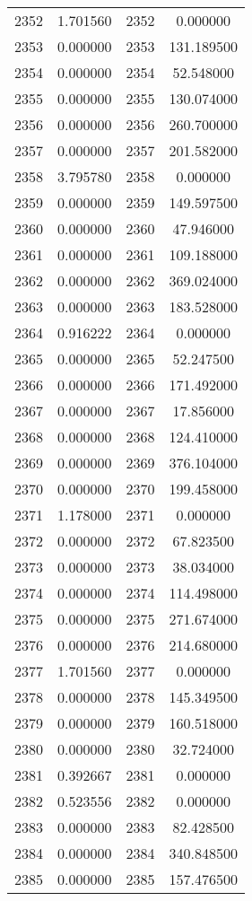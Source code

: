 \documentclass[12pt]{article}
\begin{document}
\begin{longtable}{@{}cccc@{}}
2352 & 1.701560 & 2352 & 0.000000 \\
2353 & 0.000000 & 2353 & 131.189500 \\
2354 & 0.000000 & 2354 & 52.548000 \\
2355 & 0.000000 & 2355 & 130.074000 \\
2356 & 0.000000 & 2356 & 260.700000 \\
2357 & 0.000000 & 2357 & 201.582000 \\
2358 & 3.795780 & 2358 & 0.000000 \\
2359 & 0.000000 & 2359 & 149.597500 \\
2360 & 0.000000 & 2360 & 47.946000 \\
2361 & 0.000000 & 2361 & 109.188000 \\
2362 & 0.000000 & 2362 & 369.024000 \\
2363 & 0.000000 & 2363 & 183.528000 \\
2364 & 0.916222 & 2364 & 0.000000 \\
2365 & 0.000000 & 2365 & 52.247500 \\
2366 & 0.000000 & 2366 & 171.492000 \\
2367 & 0.000000 & 2367 & 17.856000 \\
2368 & 0.000000 & 2368 & 124.410000 \\
2369 & 0.000000 & 2369 & 376.104000 \\
2370 & 0.000000 & 2370 & 199.458000 \\
2371 & 1.178000 & 2371 & 0.000000 \\
2372 & 0.000000 & 2372 & 67.823500 \\
2373 & 0.000000 & 2373 & 38.034000 \\
2374 & 0.000000 & 2374 & 114.498000 \\
2375 & 0.000000 & 2375 & 271.674000 \\
2376 & 0.000000 & 2376 & 214.680000 \\
2377 & 1.701560 & 2377 & 0.000000 \\
2378 & 0.000000 & 2378 & 145.349500 \\
2379 & 0.000000 & 2379 & 160.518000 \\
2380 & 0.000000 & 2380 & 32.724000 \\
2381 & 0.392667 & 2381 & 0.000000 \\
2382 & 0.523556 & 2382 & 0.000000 \\
2383 & 0.000000 & 2383 & 82.428500 \\
2384 & 0.000000 & 2384 & 340.848500 \\
2385 & 0.000000 & 2385 & 157.476500 \\

\end{longtable}
\end{document}
